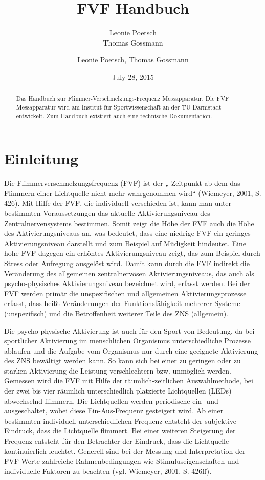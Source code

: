 \documentclass[11pt,accentcolor=tud2a,colorback,noheadingspace]{tudreport}
\date{July 28, 2015}
\author{Leonie Poetsch, Thomas Gossmann}
\title{FVF Handbuch}
\subtitle{Leonie Poetsch\\Thomas Gossmann}
\begin{document}
\maketitle

\begin{abstract}
Das Handbuch zur Flimmer-Verschmelzungs-Frequenz Messapparatur. Die 
FVF Messapparatur wird am Institut für Sportwissenschaft an der TU Darmstadt 
entwickelt. Zum Handbuch existiert auch eine  
\href{https://fvf.readthedocs.org}{technische Dokumentation}.
\end{abstract}

\tableofcontents

\chapter{Einleitung}
\label{introduction:einleitung}
\label{introduction::doc}
\label{introduction:fvf-handbuch}


Die Flimmerverschmelzungsfrequenz (FVF) ist der „ Zeitpunkt ab dem das Flimmern 
einer Lichtquelle nicht mehr wahrgenommen wird“ (Wiemeyer, 2001, S. 426). Mit Hilfe 
der FVF, die individuell verschieden ist, kann man unter bestimmten Voraussetzungen 
das aktuelle Aktivierungsniveau des Zentralnervensystems bestimmen.  Somit zeigt 
die Höhe der FVF auch die Höhe des Aktivierungsniveaus an, was bedeutet, dass eine 
niedrige FVF ein geringes Aktivierungsniveau darstellt und zum Beispiel auf 
Müdigkeit hindeutet. Eine hohe FVF dagegen ein erhöhtes Aktivierungsniveau zeigt, 
das zum Beispiel durch Stress oder Aufregung ausgelöst wird. Damit kann durch die 
FVF indirekt die Veränderung des allgemeinen zentralnervösen Aktivierungsniveaus, 
das auch als psycho-physisches Aktivierungsniveau bezeichnet wird, erfasst werden. 
Bei der FVF werden primär die unspezifischen und allgemeinen Aktivierungsprozesse 
erfasst, dass heißt Veränderungen der Funktionsfähigkeit mehrerer Systeme 
(unspezifisch) und die Betroffenheit weiterer Teile des ZNS (allgemein).

Die psycho-physische Aktivierung ist auch für den Sport von Bedeutung, da bei 
sportlicher Aktivierung im menschlichen Organismus unterschiedliche Prozesse 
ablaufen und die Aufgabe vom Organismus nur durch eine geeignete Aktivierung 
des ZNS bewältigt werden kann. So kann sich bei einer zu geringen oder zu 
starken Aktivierung die Leistung verschlechtern bzw. unmöglich werden. Gemessen 
wird die FVF mit Hilfe der räumlich-zeitlichen Auswahlmethode, bei der zwei bis 
vier räumlich unterschiedlich platzierte Lichtquellen (LEDs) abwechselnd flimmern. 
Die Lichtquellen werden periodische ein- und ausgeschaltet, wobei diese 
Ein-Aus-Frequenz gesteigert wird. Ab einer bestimmten individuell unterschiedlichen 
Frequenz entsteht der subjektive Eindruck, dass die Lichtquelle flimmert. Bei 
einer weiteren Steigerung der Frequenz entsteht für den Betrachter der Eindruck, 
dass die Lichtquelle kontinuierlich leuchtet. Generell sind bei der Messung und 
Interpretation der FVF-Werte zahlreiche Rahmenbedingungen wie Stimuluseigenschaften 
und individuelle Faktoren zu beachten (vgl. Wiemeyer, 2001, S. 426ff).
\end{document}
